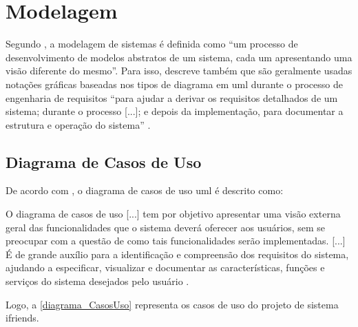 \section{Modelagem}
Segundo , a modelagem de sistemas é definida como ``um processo de desenvolvimento de modelos abstratos de um sistema, cada um apresentando uma visão diferente do mesmo''. Para isso, descreve também que são geralmente usadas notações gráficas baseadas nos tipos de diagrama em \acs{uml} durante o processo de engenharia de requisitos ``para ajudar a derivar os requisitos detalhados de um sistema; durante o processo [...]; e depois da implementação, para documentar a estrutura e operação do sistema'' \cite{SOMMERVILLE:2019}. 

\subsection{Diagrama de Casos de Uso}
De acordo com , o diagrama de casos de uso \acs{uml} é descrito como:

\begin{citacao}
O diagrama de casos de uso [...] tem por objetivo apresentar uma visão externa geral das funcionalidades que o sistema deverá oferecer aos usuários, sem se preocupar com a questão de como tais funcionalidades serão implementadas. [...] É de grande auxílio para a identificação e compreensão dos requisitos do sistema, ajudando a especificar, visualizar e documentar as características, funções e serviços do sistema desejados pelo usuário \cite{umlGuedes}.
\end{citacao}

Logo, a \autoref{diagrama_CasosUso} representa os casos de uso do projeto de sistema \gls{ifriends}.

